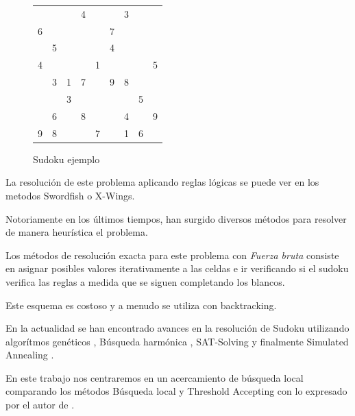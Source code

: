 \documentclass[a4paper,spanish]{article}
\begin{document}
\begin{figure}[H]
    \begin{center}
        \begin{tabular}{||c | c | c|| c| c| c|| c| c| c||}
            \hline
            \hline
            &   &   &   &   &   &   &   &   \\
            \hline
            &   &   & 4 &   &   & 3 &   &   \\
            \hline
            6 &   &   &   &   & 7 &   &   &   \\
            \hline
            \hline
            & 5 &   &   &   & 4 &   &   &   \\
            \hline
            4 &   &   &   & 1 &   &   &   & 5 \\
            \hline
            & 3 & 1 & 7 &   & 9 & 8 &   &   \\
            \hline
            \hline
            &   & 3 &   &   &   &   & 5 &   \\
            \hline
            & 6 &   & 8 &   &   & 4 &   & 9 \\
            \hline
            9 & 8 &   &   & 7 &   & 1 & 6 &   \\
            \hline
            \hline

        \end{tabular}
        \label{tab:sudoku_ejemplo}
        \caption{Sudoku ejemplo}
    \end{center}
\end{figure}


La resolución de este problema aplicando reglas lógicas se puede ver en los
metodos Swordfish  o X-Wings.

Notoriamente en los últimos tiempos, han surgido diversos métodos para resolver
de manera heurística el problema.

Los métodos de resolución exacta para este problema con \emph{Fuerza bruta}
consiste en asignar posibles valores iterativamente a las celdas e ir
verificando si el sudoku verifica las reglas a medida que se siguen completando
los blancos.

Este esquema es costoso y a menudo se utiliza con backtracking.


En la actualidad se han encontrado avances en la resolución de Sudoku utilizando
algorítmos genéticos \cite{mantere2007solving}, Búsqueda harmónica
\cite{geem2007harmony}, SAT-Solving \cite{lynce2006sudoku} y finalmente
Simulated Annealing \cite{lewis2007metaheuristics}.


En este trabajo nos centraremos en un acercamiento de búsqueda local comparando
los métodos Búsqueda local\cite{aarts2003local} y Threshold
Accepting\cite{dueck1990threshold} con lo expresado por el autor de
\cite{lewis2007metaheuristics}.
\end{document}
